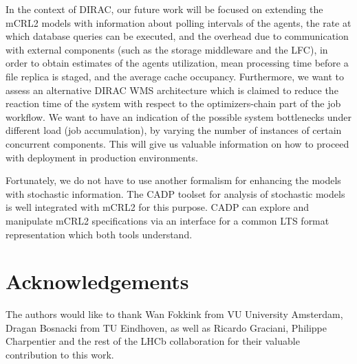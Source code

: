 \documentclass[sort&compress,preprint,3p]{elsarticle}
\begin{document}
In the context of DIRAC, our future work will be focused on extending the mCRL2 models with information about polling intervals of the agents, the rate at which database queries can be executed, and the overhead due to communication with external components (such as the storage middleware and the LFC), in order to obtain estimates of the agents utilization, mean processing time before a file replica is staged, and the average cache occupancy. 
Furthermore, we want to assess an alternative DIRAC WMS architecture which is claimed to reduce the reaction time of the system with respect to the optimizers-chain part of the job workflow. We want to have an indication of the possible system bottlenecks under different load (job accumulation), by varying the number of instances of certain concurrent components. This will give us valuable information on how to proceed with deployment in production environments.

Fortunately, we do not have to use another formalism for enhancing the models with stochastic information. The CADP toolset \cite{CADP2010} for analysis of stochastic models is well integrated with mCRL2 for this purpose. CADP can explore and manipulate mCRL2 specifications via an interface for a common LTS format representation \cite{CADPPerformanceEval} which both tools understand. 
\section*{Acknowledgements}
The authors would like to thank Wan Fokkink from VU University Amsterdam, Dragan Bosnacki from TU Eindhoven,
as well as Ricardo Graciani, Philippe Charpentier and the rest of the LHCb collaboration for their valuable contribution to this work.
 

\end{document}
